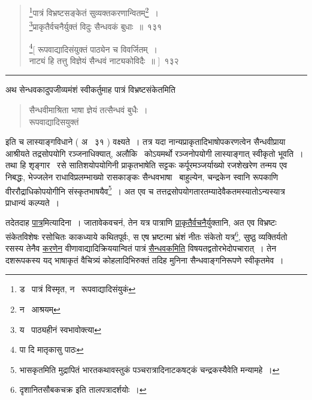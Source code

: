 \documentclass[11pt, openany]{book}
\begin{document}
\newpage

\begin{quote}
{\na \renewcommand{\thefootnote}{1}\footnote{ड \textendash\ पात्रं विस्मृत, न \textendash\ रूपवाद्यादिसंयुकं}पात्रं विभ्रष्टसङ्केतं सुव्यक्तकरणान्वितम्\renewcommand{\thefootnote}{2}\footnote{न \textendash\ आश्रयम्}~।\\
\renewcommand{\thefootnote}{3}\footnote{य \textendash\ पाठ्यहीनं स्वभावोक्त्या}प्राकृतैर्वचनैर्युक्तं विदुः सैन्धवकं बुधाः~॥~१३१

\renewcommand{\thefootnote}{4}\footnote{पा दि मातृकासु पाठः}[ रूपवाद्यादिसंयुक्तं पाठ्येन च विवर्जितम्~।\\
नाट्यं हि तत्तु विज्ञेयं सैन्धवं नाट्यकोविदैः~॥ ]~१३२}
\end{quote}

\hrule

\vspace{2mm}
अथ सेन्धवकादुपजीव्यमंशं स्वीकर्तुमाह पात्रं विभ्रष्टसंकेतमिति 

\begin{quote}
{\qt सैन्धवीमाश्रिता भाषा ज्ञेयं तत्सैन्धवं बुधैः~।\\
रूपवाद्यादिसयुक्तं}
\end{quote}

\noindent
इति च लास्याङ्गविधाने ( अ \textendash\ ३१ ) वक्ष्यते~। तत्र यदा नान्यप्राकृतादिभाषोपकरणत्वेन सैन्धवीप्राया आश्रीयते तद्रसोपयोगि रञ्जनाधिक्यात्, अलौकि \textendash\ कोऽयमर्थो रञ्जनोपयोगी लास्याङ्गात् स्वीकृतो भूवति~। तथा हि शृङ्गार \textendash\ रसे सातिशयोपयोगिनी प्राकृतभाषेति सट्टकः कर्पूरमञ्जर्याख्यो रजशेखरेण तन्मय एव निबद्धः, भेज्जलेन राधाविप्रलम्भाख्यो रासकाङ्कः सैन्धवभाषा \textendash\ बाहुल्येन, चन्द्रकेन स्वानि रूपकाणि वीररौद्राधिकोपयोगीनि संस्कृतभाषयैव\renewcommand{\thefootnote}{*}\footnote{भासकृतमिति मुद्रापितं भारतकथावस्तुकं पञ्चरात्रादिनाटकषट्कं चन्द्रकस्यैवेति मन्यामहे~।}~। अत एव च तत्तद्रसोपयोगतारतम्यादेवैकतमस्यातोऽन्यस्यात्र प्राधान्यं कल्प्यते~।\\

\begin{sloppypar}
तदेतदाह \underline{पात्र}मित्यादिना~। जातावेकवचनं, तेन यत्र पात्राणि \underline{प्राकृतैर्वचनैर्यु}क्तानि, अत एव विभ्रष्टः संकेतविशेषः रसोचितः काकध्याये कथितपूर्वः, स एष भ्रष्टत्मा भ्रंशं नीतः संकेतो यत्र\renewcommand{\thefootnote}{$\dagger$}\footnote{दृशानितसौबकचक्र इति तालपत्रादर्शयोः~।}, सुष्ठु व्यक्तिर्यतो रसस्य तेनैव \underline{करणेन} वीणावाद्यादिक्रिययान्वितं पात्रं \underline{सैन्धवकमिति} विषयतद्वतोरभेदोपचारात्~। तेन दशरूपकस्य यद् भाषाकृतं वैचित्र्यं कोहलादिभिरुक्तं तदिह मुनिना सैन्धवाङ्गनिरूपणे स्वीकृतमेव~।
\end{sloppypar}
\end{document}
